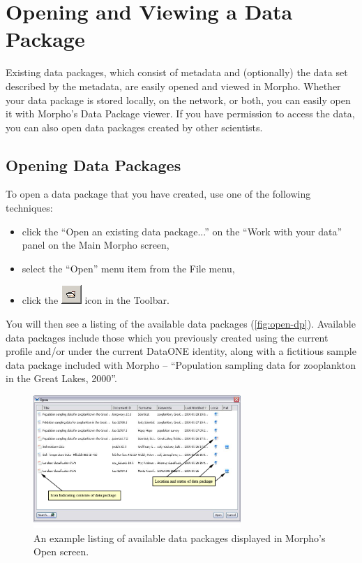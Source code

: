 \section{Opening and Viewing a Data Package} \label{sec:viewing}

Existing data packages, which consist of metadata and (optionally) the
data set described by the metadata, are easily opened and viewed in
Morpho. Whether your data package is stored locally, on the network, or
both, you can easily open it with Morpho's Data Package viewer. If you
have permission to access the data, you can also open data packages
created by other scientists. 

\subsection{Opening Data Packages}

To open a data package that you have created, use one of the following
techniques:

\begin{itemize}
  \setlength{\parskip}{1pt}
  \item click the ``Open an existing data package...'' on the ``Work
    with your data'' panel on the Main Morpho screen,
  \item select the ``Open'' menu item from the File menu,
  \item click the \includegraphics[scale=0.7]{images/button-open.png}
  icon in the Toolbar.
\end{itemize}

You will then see a listing of the available data packages
(\autoref{fig:open-dp}). Available data packages include those which you
previously created using the current profile and/or under the current
DataONE identity, along with a fictitious sample data package included with
Morpho -- ``Population sampling data for zooplankton in the Great Lakes,
2000''.

\begin{figure}
  \centering
    \includegraphics[width=0.7\textwidth]{images/open-dp.jpg}
  \caption{An example listing of available data packages displayed in
    Morpho's Open screen.}
  \label{fig:open-dp}
\end{figure}

